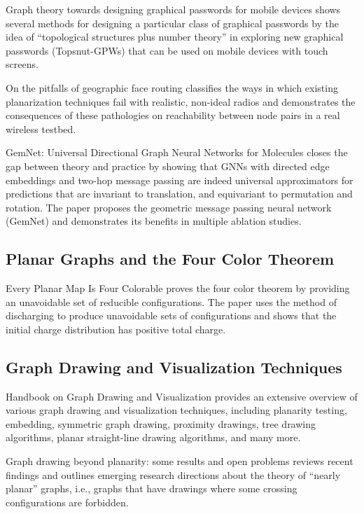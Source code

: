 \documentclass{article}
\begin{document}
Graph theory towards designing graphical passwords for mobile devices \cite{Yao2017GraphTT} shows several methods for designing a particular class of graphical passwords by the idea of ``topological structures plus number theory'' in exploring new graphical passwords (Topsnut-GPWs) that can be used on mobile devices with touch screens.

On the pitfalls of geographic face routing \cite{Kim2005OnTP} classifies the ways in which existing planarization techniques fail with realistic, non-ideal radios and demonstrates the consequences of these pathologies on reachability between node pairs in a real wireless testbed.

GemNet: Universal Directional Graph Neural Networks for Molecules \cite{Klicpera2021GemNetUD} closes the gap between theory and practice by showing that GNNs with directed edge embeddings and two-hop message passing are indeed universal approximators for predictions that are invariant to translation, and equivariant to permutation and rotation. The paper proposes the geometric message passing neural network (GemNet) and demonstrates its benefits in multiple ablation studies.

\subsection{Planar Graphs and the Four Color Theorem}

Every Planar Map Is Four Colorable \cite{Appel2019EveryPM} proves the four color theorem by providing an unavoidable set of reducible configurations. The paper uses the method of discharging to produce unavoidable sets of configurations and shows that the initial charge distribution has positive total charge.

\subsection{Graph Drawing and Visualization Techniques}

Handbook on Graph Drawing and Visualization \cite{Tamassia2013HandbookOG} provides an extensive overview of various graph drawing and visualization techniques, including planarity testing, embedding, symmetric graph drawing, proximity drawings, tree drawing algorithms, planar straight-line drawing algorithms, and many more.

Graph drawing beyond planarity: some results and open problems \cite{Liotta2014GraphDB} reviews recent findings and outlines emerging research directions about the theory of ``nearly planar'' graphs, i.e., graphs that have drawings where some crossing configurations are forbidden.
\end{document}
